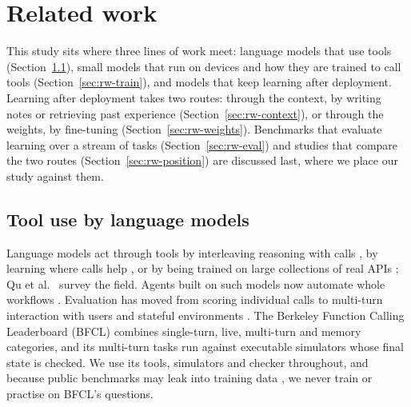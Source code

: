 \documentclass[a4paper,fleqn]{cas-dc}
\begin{document}
\section{Related work}\label{sec:related}
This study sits where three lines of work meet: language models that use tools (Section~\ref{sec:rw-tools}), small
models that run on devices and how they are trained to call tools (Section~\ref{sec:rw-train}), and models that keep
learning after deployment. Learning after deployment takes two routes: through the context, by writing notes or retrieving past
experience (Section~\ref{sec:rw-context}), or through the weights, by fine-tuning (Section~\ref{sec:rw-weights}). Benchmarks
that evaluate learning over a stream of tasks (Section~\ref{sec:rw-eval}) and studies that compare the two routes
(Section~\ref{sec:rw-position}) are discussed last, where we place our study against them.

\subsection{Tool use by language models}\label{sec:rw-tools}
Language models act through tools by interleaving reasoning with calls \citep{yao2023react}, by learning where calls
help \citep{schick2023toolformer}, or by being trained on large collections of real APIs
\citep{patil2024gorilla,qin2024toolllm}; Qu et al.~\citep{qu2025tool} survey the field. Agents built on such models now automate whole workflows \citep{liu2026automating}.
Evaluation has moved from scoring individual calls \citep{li2023apibank} to multi-turn interaction with users and stateful
environments \citep{yao2025taubench}. The Berkeley Function Calling Leaderboard (BFCL) \citep{patil2025berkeley}
combines single-turn, live, multi-turn and memory categories, and its multi-turn tasks run against executable simulators
whose final state is checked. We use its tools, simulators and checker throughout, and because public benchmarks may
leak into training data \citep{golchin2024time}, we never train or practise on BFCL's questions.
\end{document}

